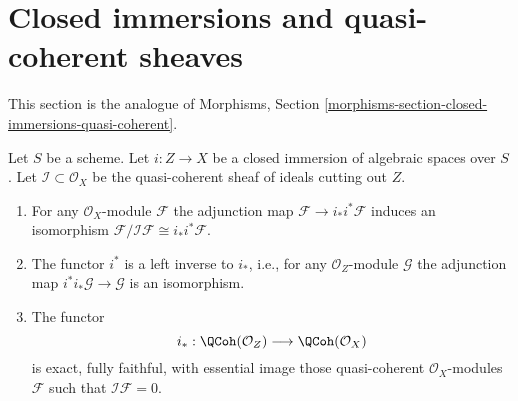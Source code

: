 \section{Closed immersions and quasi-coherent sheaves}
\label{section-closed-immersions-quasi-coherent}

\noindent
This section is the analogue of
Morphisms, Section \ref{morphisms-section-closed-immersions-quasi-coherent}.

\begin{lemma}
\label{lemma-i-star-equivalence}
Let $S$ be a scheme. Let $i : Z \to X$ be a closed immersion of algebraic
spaces over $S$. Let $\mathcal{I} \subset \mathcal{O}_X$ be the quasi-coherent
sheaf of ideals cutting out $Z$.
\begin{enumerate}
\item For any $\mathcal{O}_X$-module $\mathcal{F}$ the adjunction map
$\mathcal{F} \to i_*i^*\mathcal{F}$ induces an isomorphism
$\mathcal{F}/\mathcal{I}\mathcal{F} \cong i_*i^*\mathcal{F}$.
\item The functor $i^*$ is a left inverse to $i_*$, i.e., for any
$\mathcal{O}_Z$-module $\mathcal{G}$ the adjunction map
$i^*i_*\mathcal{G} \to \mathcal{G}$ is an isomorphism.
\item The functor
$$
i_* :
\QCoh(\mathcal{O}_Z)
\longrightarrow
\QCoh(\mathcal{O}_X)
$$
is exact, fully faithful, with essential image those quasi-coherent
$\mathcal{O}_X$-modules $\mathcal{F}$ such that $\mathcal{I}\mathcal{F} = 0$.
\end{enumerate}
\end{lemma}

